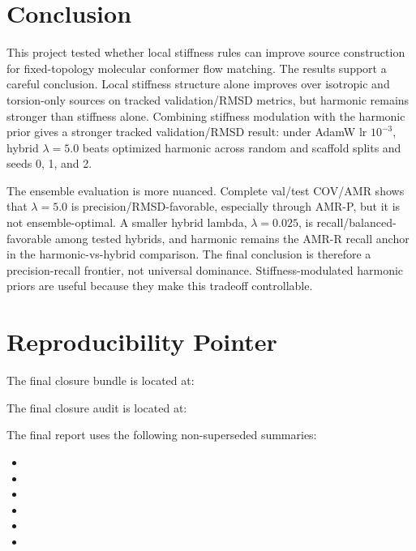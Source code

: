 \documentclass[11pt]{article}
\begin{document}
\section{Conclusion}

This project tested whether local stiffness rules can improve source construction for fixed-topology molecular conformer flow matching. The results support a careful conclusion. Local stiffness structure alone improves over isotropic and torsion-only sources on tracked validation/RMSD metrics, but harmonic remains stronger than stiffness alone. Combining stiffness modulation with the harmonic prior gives a stronger tracked validation/RMSD result: under AdamW lr $10^{-3}$, hybrid $\lambda=5.0$ beats optimized harmonic across random and scaffold splits and seeds 0, 1, and 2.

The ensemble evaluation is more nuanced. Complete val/test COV/AMR shows that $\lambda=5.0$ is precision/RMSD-favorable, especially through AMR-P, but it is not ensemble-optimal. A smaller hybrid lambda, $\lambda=0.025$, is recall/balanced-favorable among tested hybrids, and harmonic remains the AMR-R recall anchor in the harmonic-vs-hybrid comparison. The final conclusion is therefore a precision-recall frontier, not universal dominance. Stiffness-modulated harmonic priors are useful because they make this tradeoff controllable.

\appendix

\section{Reproducibility Pointer}

The final closure bundle is located at:
\begin{quote}
\end{quote}

The final closure audit is located at:
\begin{quote}
\end{quote}

The final report uses the following non-superseded summaries:
\begin{itemize}
    \item {}
    \item {}
    \item {}
    \item {}
    \item {}
    \item {}
\end{itemize}
\end{document}
